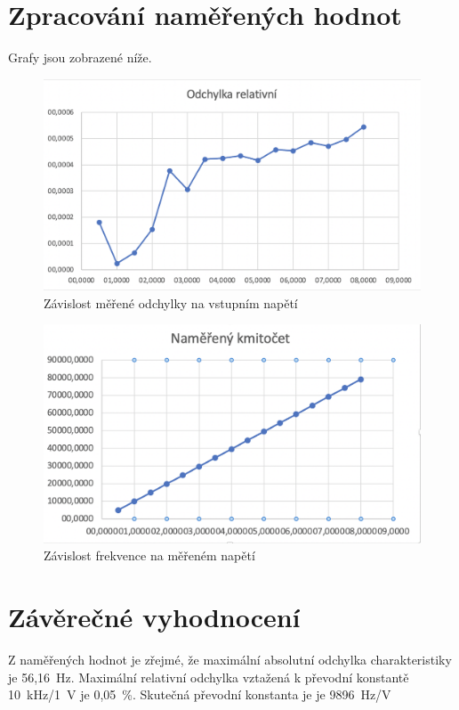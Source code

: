 \documentclass[a4paper,12pt]{article}   %
\begin{document}
\section{Zpracování naměřených hodnot}
\label{chap:zpracovani_hodnot}
Grafy jsou zobrazené níže.

\begin{figure}
  \centering
  \includegraphics[width=\textwidth]{graf1.png}
  \caption{Závislost měřené odchylky na vstupním napětí}
\end{figure}

\begin{figure}
  \centering
  \includegraphics[width=\textwidth]{graf2.png}
  \caption{Závislost frekvence na měřeném napětí}
\end{figure}


\section{Závěrečné vyhodnocení}
\label{chap:zaver}
Z naměřených hodnot je zřejmé, že maximální absolutní odchylka charakteristiky je 56,16~Hz. Maximální relativní odchylka vztažená k převodní konstantě 10~kHz/1~V je 0,05~\%. Skutečná převodní konstanta je je 9896~Hz/V
\end{document}
